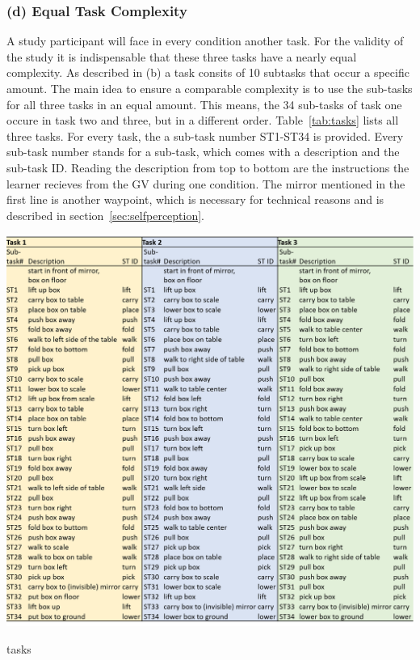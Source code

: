 \subsubsection{(d) Equal Task Complexity}
A study participant will face in every condition another task. For the validity of the study it is indispensable that these three tasks have a nearly equal complexity. As described in (b) a task consits of 10 subtasks that occur a specific amount. The main idea to ensure a comparable complexity is to use the sub-tasks for all three tasks in an equal amount. This means, the 34 sub-tasks of task one occure in task two and three, but in a different order. Table~\ref{tab:tasks} lists all three tasks. For every task, the a sub-task number ST1-ST34 is provided. Every sub-task number stands for a sub-task, which comes with a description and the sub-task ID. Reading the description from top to bottom are the instructions the learner recieves from the GV during one condition. The mirror mentioned in the first line is another waypoint, which is necessary for technical reasons and is described in section~\ref{sec:selfperception}.

\begin{table}[H]
	\centering
	\includegraphics[width=\textwidth]{figures/tasks.png}
	\caption[Description of tasks]{tasks}
	\label{tab:tasks}
\end{table}

